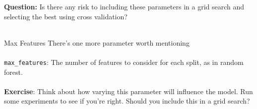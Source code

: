 \begin{frame}

\textbf{Question:} Is there any risk to including these parameters in a grid search and selecting the best using cross validation?\\~\\


\end{frame}
%
\begin{frame}{Max Features}
There's one more parameter worth mentioning\\~\\

\texttt{max\_features}: The number of features to consider for each split, as in random forest.\\~\\

\textbf{Exercise}: Think about how varying this parameter will influence the model.  Run some experiments to see if you're right.  Should you include this in a grid search?
\end{frame}
  
  
